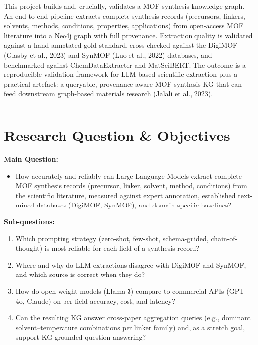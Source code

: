 \documentclass[11pt,a4paper]{article}
\newcommand{\srhrule}{\vspace{0.4ex}\noindent\textcolor{srhorange}{\rule{\linewidth}{0.4pt}}\vspace{0.6ex}}
\begin{document}
This project builds and, crucially, validates a MOF synthesis knowledge graph. An end-to-end pipeline extracts complete synthesis records (precursors, linkers, solvents, methods, conditions, properties, applications) from open-access MOF literature into a Neo4j graph with full provenance. Extraction quality is validated against a hand-annotated gold standard, cross-checked against the DigiMOF (Glasby et al., 2023) and SynMOF (Luo et al., 2022) databases, and benchmarked against ChemDataExtractor and MatSciBERT. The outcome is a reproducible validation framework for LLM-based scientific extraction plus a practical artefact: a queryable, provenance-aware MOF synthesis KG that can feed downstream graph-based materials research (Jalali et al., 2023).
\srhrule

\section{Research Question \& Objectives}
\textbf{Main Question:}
\begin{itemize}
  \item How accurately and reliably can Large Language Models extract complete MOF synthesis records (precursor, linker, solvent, method, conditions) from the scientific literature, measured against expert annotation, established text-mined databases (DigiMOF, SynMOF), and domain-specific baselines?
\end{itemize}

\textbf{Sub-questions:}
\begin{enumerate}
  \item Which prompting strategy (zero-shot, few-shot, schema-guided, chain-of-thought) is most reliable for each field of a synthesis record?
  \item Where and why do LLM extractions disagree with DigiMOF and SynMOF, and which source is correct when they do?
  \item How do open-weight models (Llama-3) compare to commercial APIs (GPT-4o, Claude) on per-field accuracy, cost, and latency?
  \item Can the resulting KG answer cross-paper aggregation queries (e.g., dominant solvent--temperature combinations per linker family) and, as a stretch goal, support KG-grounded question answering?
\end{enumerate}
\end{document}
